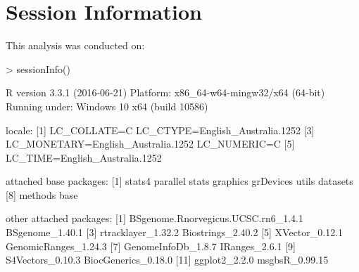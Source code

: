 \documentclass{article}
\begin{document}
\section{Session Information}
This analysis was conducted on:
\begin{Schunk}
\begin{Sinput}
> sessionInfo()
\end{Sinput}
\begin{Soutput}
R version 3.3.1 (2016-06-21)
Platform: x86_64-w64-mingw32/x64 (64-bit)
Running under: Windows 10 x64 (build 10586)

locale:
[1] LC_COLLATE=C                       LC_CTYPE=English_Australia.1252   
[3] LC_MONETARY=English_Australia.1252 LC_NUMERIC=C                      
[5] LC_TIME=English_Australia.1252    

attached base packages:
[1] stats4    parallel  stats     graphics  grDevices utils     datasets 
[8] methods   base     

other attached packages:
 [1] BSgenome.Rnorvegicus.UCSC.rn6_1.4.1 BSgenome_1.40.1                    
 [3] rtracklayer_1.32.2                  Biostrings_2.40.2                  
 [5] XVector_0.12.1                      GenomicRanges_1.24.3               
 [7] GenomeInfoDb_1.8.7                  IRanges_2.6.1                      
 [9] S4Vectors_0.10.3                    BiocGenerics_0.18.0                
[11] ggplot2_2.2.0                       msgbsR_0.99.15                     


\end{Soutput}
\end{Schunk}
\end{document}
